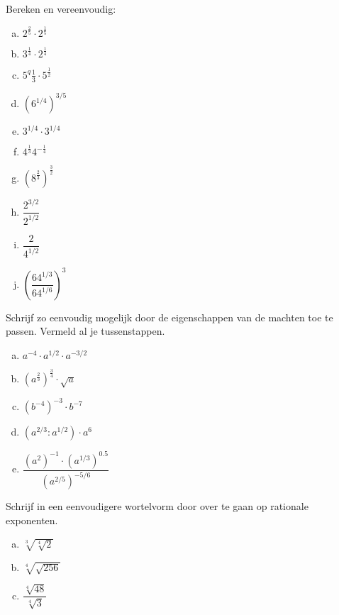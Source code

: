 \documentclass[12pt,twoside]{article}
\begin{document}
\begin{oefening}
Bereken en vereenvoudig:
\begin{multicols}{3}
\begin{enumerate}[(a)]
  \item $2^\frac{2}{5}\cdot2^\frac{1}{5}$
  \item $3^\frac{1}{4}\cdot 2^\frac{1}{4}$
  \item $5^q\frac{1}{3}\cdot 5^\frac{1}{2}$
  \item $\left(6^{1/4}\right)^{3/5}$
  \item $3^{1/4}\cdot 3^{1/4}$
  \item $4^\frac{1}{3}4^{-\frac{1}{4}}$
  \item $\left(8^\frac{2}{3}\right)^\frac{3}{2}$
  \item $\dfrac{2^{3/2}}{2^{1/2}}$
  \item $\dfrac{2}{4^{1/2}}$
  \item $\left(\dfrac{64^{1/3}}{64^{1/6}}\right)^3$
\end{enumerate}
\end{multicols}
\end{oefening}

\begin{oefening}
Schrijf zo eenvoudig mogelijk door de eigenschappen van de machten toe te passen. Vermeld al je tussenstappen.
\begin{multicols}{2}
\begin{enumerate}[(a)]
  \item $a^{-4}\cdot a^{1/2}\cdot a^{-3/2}$
  \item $\left(a^{\frac{2}{3}}\right)^{\frac{3}{4}}\cdot \sqrt{a}$
  \item $\left(b^{-4}\right)^{-3}\cdot b^{-7}$
  \item $\left(a^{2/3}:a^{1/2}\right)\cdot a^6$
  \item $\dfrac{\left(a^2\right)^{-1}\cdot\left(a^{1/3}\right)^{0.5}}{\left(a^{2/5}\right)^{-5/6}}$
\end{enumerate}
\end{multicols}
\end{oefening}

\begin{oefening}
Schrijf in een eenvoudigere wortelvorm door over te gaan op rationale exponenten.
\begin{multicols}{2}
\begin{enumerate}[(a)]
  \item $\sqrt[3]{\sqrt[4]{2}}$
  \item $\sqrt[4]{\sqrt{256}}$
  \item $\dfrac{\sqrt[4]{48}}{\sqrt[4]{3}}$
\end{enumerate}
\end{multicols}
\end{oefening}
\end{document}
